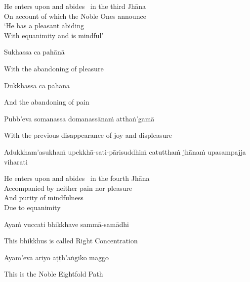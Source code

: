 \begin{english-verses}
  He enters upon and abides \breathmark\ in the third Jhāna\\
  On account of which the Noble Ones announce\\
  `He has a pleasant abiding\\
  With equanimity and is mindful'
\end{english-verses}

Sukhassa ca pahānā

\begin{english}
  With the abandoning of pleasure
\end{english}

Dukkhassa ca pahānā

\begin{english}
  And the abandoning of pain
\end{english}

Pubb'eva somanassa domanassānaṁ atthaṅ'gamā

\begin{english}
  With the previous disappearance of joy and displeasure\makeatletter\hyperlink{endnote67-appendix}\makeatother
\end{english}

\begin{pali-hang}
  Adukkham'asukhaṁ upekkhā-sati-pārisuddhiṁ catutthaṁ jhānaṁ upasampajja viharati
\end{pali-hang}

\begin{english-verses}
  He enters upon and abides \breathmark\ in the fourth Jhāna\\
  Accompanied by neither pain nor pleasure\\
  And purity of mindfulness\\
  Due to equanimity
\end{english-verses}

Ayaṁ vuccati bhikkhave sammā-samādhi

\begin{english}
  This bhikkhus is called Right Concentration
\end{english}

Ayam'eva ariyo aṭṭh'aṅgiko maggo

\begin{english}
  This is the Noble Eightfold Path
\end{english}

